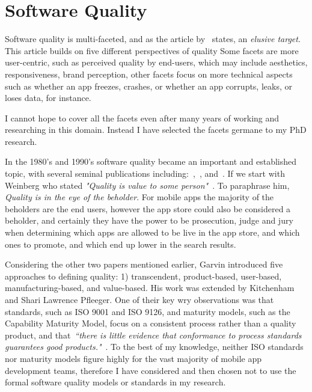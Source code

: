 \hypertarget{software.quality}{}
\section{Software Quality}
Software quality is multi-faceted, and as the article by~\citep{kitchenham1996_software_quality_elusive_target} states, an \emph{elusive target}. This article builds on five different perspectives of quality Some facets are more user-centric, such as perceived quality by end-users, which may include aesthetics, responsiveness, brand perception, other facets focus on more technical aspects such as whether an app freezes, crashes, or whether an app corrupts, leaks, or loses data, for instance. 


I cannot hope to %
cover all the facets even after many years of working and researching in this domain. Instead I have selected the facets germane to my PhD research.

In the 1980's and 1990's software quality became an important and established topic, with several seminal publications including:~\citep{garvin1984_what_does_product_quality_really_mean},~\citep{weinberg1992quality}, and~\citep{kitchenham1996_software_quality_elusive_target}. If we start with Weinberg who stated \emph{"Quality is value to some person"}~\cite{weinberg1992quality}. To paraphrase him, \emph{Quality is in the eye of the beholder}. For mobile apps the majority of the beholders are the end users, however the app store could also be considered a beholder, and certainly they have the power to be prosecution, judge and jury when determining which apps are allowed to be live in the app store, and which ones to promote, and which end up lower in the search results.

Considering the other two papers mentioned earlier, Garvin introduced five approaches to defining quality: 1) transcendent, product-based, user-based, manufacturing-based, and value-based. His work was extended by Kitchenham and Shari Lawrence Pfleeger. One of their key wry observations was that standards, such as ISO 9001 and ISO 9126, and maturity models, such as the Capability Maturity Model, focus on a consistent process rather than a quality product, and that~\emph{``there is little evidence that conformance to process standards guarantees good products."}~\citep{kitchenham1996_software_quality_elusive_target}. To the best of my knowledge, neither ISO standards nor maturity models figure highly for the vast majority of mobile app development teams, therefore I have considered and then chosen not to use the formal software quality models or standards in my research. 

